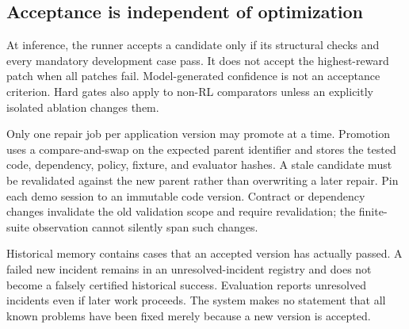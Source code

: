 \documentclass[11pt,a4paper]{article}
\begin{document}
\subsection{Acceptance is independent of optimization}
At inference, the runner accepts a candidate only if its structural checks and every mandatory development case pass. It does not accept the highest-reward patch when all patches fail. Model-generated confidence is not an acceptance criterion. Hard gates also apply to non-RL comparators unless an explicitly isolated ablation changes them.

Only one repair job per application version may promote at a time. Promotion uses a compare-and-swap on the expected parent identifier and stores the tested code, dependency, policy, fixture, and evaluator hashes. A stale candidate must be revalidated against the new parent rather than overwriting a later repair. Pin each demo session to an immutable code version. Contract or dependency changes invalidate the old validation scope and require revalidation; the finite-suite observation cannot silently span such changes.

Historical memory contains cases that an accepted version has actually passed. A failed new incident remains in an unresolved-incident registry and does not become a falsely certified historical success. Evaluation reports unresolved incidents even if later work proceeds. The system makes no statement that all known problems have been fixed merely because a new version is accepted.
\end{document}
